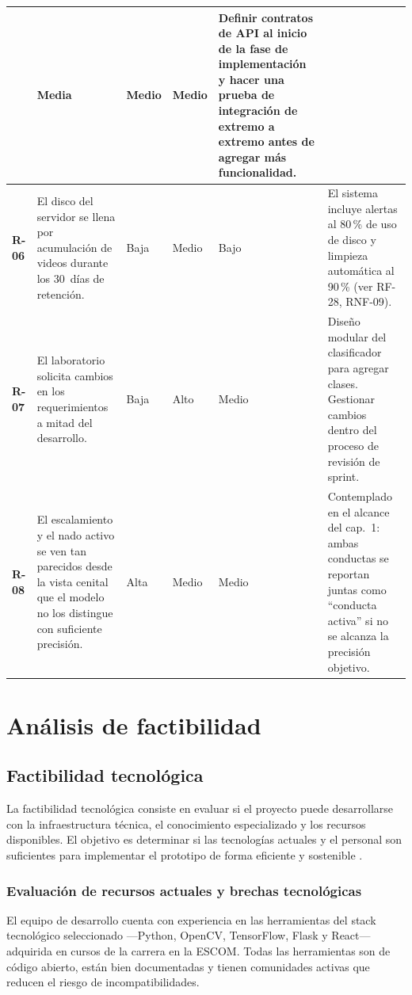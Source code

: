 \begin{longtable}{|>{\bfseries}p{0.9cm}|p{3.4cm}|p{1.3cm}|p{1.2cm}|p{1.1cm}|p{4.6cm}|}
    & Media & Medio & Medio
    & Definir contratos de API al inicio de la fase de implementación y hacer
      una prueba de integración de extremo a extremo antes de agregar más
      funcionalidad. \\
\hline
R-06 & El disco del servidor se llena por acumulación de videos durante los 30~días
      de retención.
    & Baja & Medio & Bajo
    & El sistema incluye alertas al 80\,\% de uso de disco y limpieza automática
      al 90\,\% (ver RF-28, RNF-09). \\
\hline
R-07 & El laboratorio solicita cambios en los requerimientos a mitad del desarrollo.
    & Baja & Alto & Medio
    & Diseño modular del clasificador para agregar clases. Gestionar cambios
      dentro del proceso de revisión de sprint. \\
\hline
R-08 & El escalamiento y el nado activo se ven tan parecidos desde la vista cenital
      que el modelo no los distingue con suficiente precisión.
    & Alta & Medio & Medio
    & Contemplado en el alcance del cap.~1: ambas conductas se reportan juntas
      como ``conducta activa'' si no se alcanza la precisión objetivo. \\
\hline

\end{longtable}

\section{Análisis de factibilidad}

\subsection{Factibilidad tecnológica}

La factibilidad tecnológica consiste en evaluar si el proyecto puede desarrollarse con
la infraestructura técnica, el conocimiento especializado y los recursos disponibles.
El objetivo es determinar si las tecnologías actuales y el personal son suficientes para
implementar el prototipo de forma eficiente y sostenible \cite{pressman2014}.

\subsubsection{Evaluación de recursos actuales y brechas tecnológicas}

El equipo de desarrollo cuenta con experiencia en las herramientas del stack tecnológico
seleccionado ---Python, OpenCV, TensorFlow, Flask y React--- adquirida en cursos de la
carrera en la ESCOM. Todas las herramientas son de código abierto, están bien
documentadas y tienen comunidades activas que reducen el riesgo de incompatibilidades.

